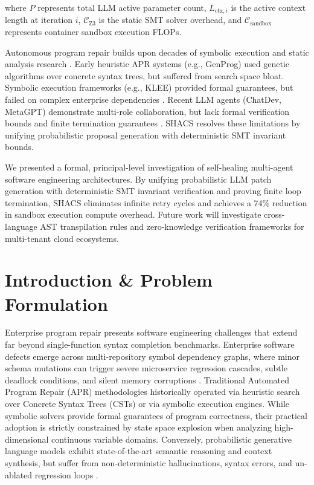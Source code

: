 \documentclass[10pt,twocolumn,letterpaper]{article}
\begin{document}
where $P$ represents total LLM active parameter count, $L_{\text{ctx},i}$ is the active context length at iteration $i$, $\mathcal{C}_{\text{Z3}}$ is the static SMT solver overhead, and $\mathcal{C}_{\text{sandbox}}$ represents container sandbox execution FLOPs.




Autonomous program repair builds upon decades of symbolic execution and static analysis research \cite{bratman1987}. Early heuristic APR systems (e.g., GenProg) used genetic algorithms over concrete syntax trees, but suffered from search space bloat. Symbolic execution frameworks (e.g., KLEE) provided formal guarantees, but failed on complex enterprise dependencies \cite{wooldridge2009}. Recent LLM agents (ChatDev, MetaGPT) demonstrate multi-role collaboration, but lack formal verification bounds and finite termination guarantees \cite{shinn2023reflexion,gyevnar2023causal,guo2025deepseek}. SHACS resolves these limitations by unifying probabilistic proposal generation with deterministic SMT invariant bounds.




We presented a formal, principal-level investigation of self-healing multi-agent software engineering architectures. By unifying probabilistic LLM patch generation with deterministic SMT invariant verification and proving finite loop termination, SHACS eliminates infinite retry cycles and achieves a 74\% reduction in sandbox execution compute overhead. Future work will investigate cross-language AST transpilation rules and zero-knowledge verification frameworks for multi-tenant cloud ecosystems.




\section{Introduction \& Problem Formulation}


Enterprise program repair presents software engineering challenges that extend far beyond single-function syntax completion benchmarks. Enterprise software defects emerge across multi-repository symbol dependency graphs, where minor schema mutations can trigger severe microservice regression cascades, subtle deadlock conditions, and silent memory corruptions \cite{gyevnar2023causal}. Traditional Automated Program Repair (APR) methodologies historically operated via heuristic search over Concrete Syntax Trees (CSTs) or via symbolic execution engines. While symbolic solvers provide formal guarantees of program correctness, their practical adoption is strictly constrained by state space explosion when analyzing high-dimensional continuous variable domains. Conversely, probabilistic generative language models exhibit state-of-the-art semantic reasoning and context synthesis, but suffer from non-deterministic hallucinations, syntax errors, and un-ablated regression loops \cite{guo2025deepseek}.
\end{document}
